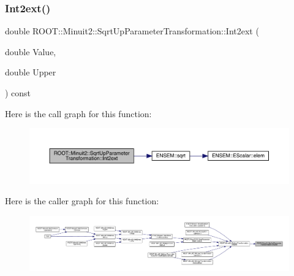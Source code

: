 \mbox{\label{classROOT_1_1Minuit2_1_1SqrtUpParameterTransformation_afd65e37e7e03cb9db5bf9906eb399fc8}} 
\subsubsection{\texorpdfstring{Int2ext()}{Int2ext()}\hspace{0.1cm}{\footnotesize\ttfamily [2/3]}}
{\footnotesize\ttfamily double R\+O\+O\+T\+::\+Minuit2\+::\+Sqrt\+Up\+Parameter\+Transformation\+::\+Int2ext (\begin{DoxyParamCaption}\item[{double}]{Value,  }\item[{double}]{Upper }\end{DoxyParamCaption}) const}

Here is the call graph for this function\+:
\nopagebreak
\begin{figure}[H]
\begin{center}
\leavevmode
\includegraphics[width=350pt]{d4/d77/classROOT_1_1Minuit2_1_1SqrtUpParameterTransformation_afd65e37e7e03cb9db5bf9906eb399fc8_cgraph}
\end{center}
\end{figure}
Here is the caller graph for this function\+:
\nopagebreak
\begin{figure}[H]
\begin{center}
\leavevmode
\includegraphics[width=350pt]{d4/d77/classROOT_1_1Minuit2_1_1SqrtUpParameterTransformation_afd65e37e7e03cb9db5bf9906eb399fc8_icgraph}
\end{center}
\end{figure}
\mbox{\label{classROOT_1_1Minuit2_1_1SqrtUpParameterTransformation_afd65e37e7e03cb9db5bf9906eb399fc8}} 
